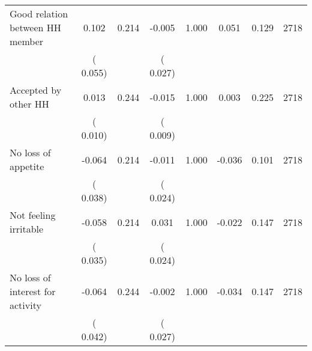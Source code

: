 \begin{tabular}{l*{7}{c}}
 Good relation between HH member       &              0.102       &        0.214  &             -0.005       &        1.000  &              0.051       &              0.129 &  2718 \\ 
                       &       (       0.055)             &                               &       (       0.027)                     &                               &                                               &                                &                      \\ 

 Accepted by other HH       &              0.013       &        0.244  &             -0.015       &        1.000  &              0.003       &              0.225 &  2718 \\ 
                       &       (       0.010)             &                               &       (       0.009)                     &                               &                                               &                                &                      \\ 

 No loss of appetite       &             -0.064       &        0.214  &             -0.011       &        1.000  &             -0.036       &              0.101 &  2718 \\ 
                       &       (       0.038)             &                               &       (       0.024)                     &                               &                                               &                                &                      \\ 

 Not feeling irritable       &             -0.058       &        0.214  &              0.031       &        1.000  &             -0.022       &              0.147 &  2718 \\ 
                       &       (       0.035)             &                               &       (       0.024)                     &                               &                                               &                                &                      \\ 

 No loss of interest for activity       &             -0.064       &        0.244  &             -0.002       &        1.000  &             -0.034       &              0.147 &  2718 \\ 
                       &       (       0.042)             &                               &       (       0.027)                     &                               &                                               &                                &                      \\ 


\end{tabular}
